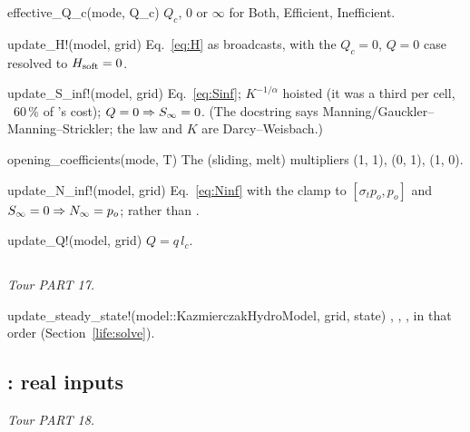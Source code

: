 \begin{fnlist}
\item[effective\_Q\_c(mode, Q\_c)] $Q_c$, $0$ or $\infty$ for Both, Efficient, Inefficient.
\item[update\_H!(model, grid)] Eq.~\eqref{eq:H} as broadcasts, with the $Q_c = 0$, $Q = 0$ case resolved to $H_{\rm soft} = 0$.
\item[update\_S\_inf!(model, grid)] Eq.~\eqref{eq:Sinf}; $K^{-1/\alpha}$ hoisted (it was a third  per cell, ~60\,\% of
  's cost); $Q = 0 \Rightarrow {S_\infty} = 0$. (The docstring says Manning/Gauckler--Manning--Strickler; the law and $K$
  are Darcy--Weisbach.)
\item[opening\_coefficients(mode, T)] The (sliding, melt) multipliers (1, 1), (0, 1), (1, 0).
\item[update\_N\_inf!(model, grid)] Eq.~\eqref{eq:Ninf} with the clamp to $[\sigma_t p_o, p_o]$ and ${S_\infty} = 0\Rightarrow{N_\infty} = p_o$;
   rather than .
\item[update\_Q!(model, grid)] $Q = q\,l_c$.
\end{fnlist}

\subsection{}\label{ref:k24run}
\emph{Tour PART 17.}
\begin{fnlist}
\item[update\_steady\_state!(model::KazmierczakHydroModel, grid, state)] , , , in that order
  (Section~\ref{life:solve}).
\end{fnlist}

\subsection{: real inputs}\label{ref:loaders}
\emph{Tour PART 18.}

